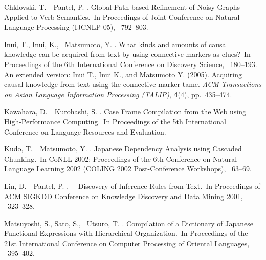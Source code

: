 \documentclass[japanese]{jnlp_1.4}
\begin{document}

\begin{thebibliography}{}

Chklovski, T.\BBACOMMA\ \BBA\ Pantel, P. \BBCP.
\newblock \BBOQ Global Path-based Refinement of Noisy Graphs Applied to Verb
  Semantics.\BBCQ\
\newblock In {\Bem Proceedings of Joint Conference on Natural Language
  Processing (IJCNLP-05)}, \mbox{\BPGS\ 792--803}.

Inui, T., Inui, K., \BBA\ Matsumoto, Y. \BBOP 2003\BBCP.
\newblock \BBOQ What kinds and amounts of causal knowledge can be acquired from
  text by using connective markers as clues?\BBCQ\
\newblock In {\Bem Proceedings of the 6th International Conference on Discovery
  Science}, \mbox{\BPGS\ 180--193}.
\newblock An extended version: Inui T., Inui K., and Matsumoto Y. (2005).
  Acquiring causal knowledge from text using the connective marker tame. {\em
  ACM Transactions on Asian Language Information Processing (TALIP)},
  \textbf{4}(4), pp.~435--474.

Kawahara, D.\BBACOMMA\ \BBA\ Kurohashi, S. \BBCP.
\newblock \BBOQ Case Frame Compilation from the Web using High-Performance
  Computing.\BBCQ\
\newblock In {\Bem Proceedings of the 5th International Conference on Language
  Resources and Evaluation}.

Kudo, T.\BBACOMMA\ \BBA\ Matsumoto, Y. \BBCP.
\newblock \BBOQ Japanese Dependency Analysis using Cascaded Chunking.\BBCQ\
\newblock In {\Bem CoNLL 2002: Proceedings of the 6th Conference on Natural
  Language Learning 2002 (COLING 2002 Post-Conference Workshops)}, \mbox{\BPGS\
  63--69}.

Lin, D.\BBACOMMA\ \BBA\ Pantel, P. \BBCP.
\newblock \BBOQ {DIRT}---Discovery of Inference Rules from Text.\BBCQ\
\newblock In {\Bem Proceedings of ACM SIGKDD Conference on Knowledge Discovery
  and Data Mining 2001}, \mbox{\BPGS\ 323--328}.

Matsuyoshi, S., Sato, S., \BBA\ Utsuro, T. \BBCP.
\newblock \BBOQ Compilation of a Dictionary of Japanese Functional Expressions
  with Hierarchical Organization.\BBCQ\
\newblock In {\Bem Proceedings of the 21st International Conference on Computer
  Processing of Oriental Languages}, \mbox{\BPGS\ 395--402}.


\end{thebibliography}
\end{document}
